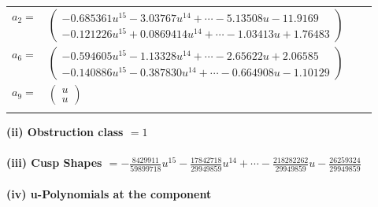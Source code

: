 \documentclass[1p]{elsarticle_modified}
\theoremstyle{definition}
\begin{document}
\begin{tabular}{m{7pt} m{180pt} m{7pt} m{180pt} }
\flushright $a_{2}=$&$\begin{pmatrix}-0.685361 u^{15}-3.03767 u^{14}+\cdots-5.13508 u-11.9169\\-0.121226 u^{15}+0.0869414 u^{14}+\cdots-1.03413 u+1.76483\end{pmatrix}$ \\
\flushright $a_{6}=$&$\begin{pmatrix}-0.594605 u^{15}-1.13328 u^{14}+\cdots-2.65622 u+2.06585\\-0.140886 u^{15}-0.387830 u^{14}+\cdots-0.664908 u-1.10129\end{pmatrix}$ \\
\flushright $a_{9}=$&$\begin{pmatrix}u\\u\end{pmatrix}$\\&\end{tabular}
\flushleft \textbf{(ii) Obstruction class $= 1$}\\~\\
\flushleft \textbf{(iii) Cusp Shapes $= -\frac{8429911}{59899718} u^{15}-\frac{17842718}{29949859} u^{14}+\cdots-\frac{218282262}{29949859} u-\frac{26259324}{29949859}$}\\~\\
\newpage\renewcommand{\arraystretch}{1}
\flushleft \textbf{(iv) u-Polynomials at the component}\newline \\
\end{document}
